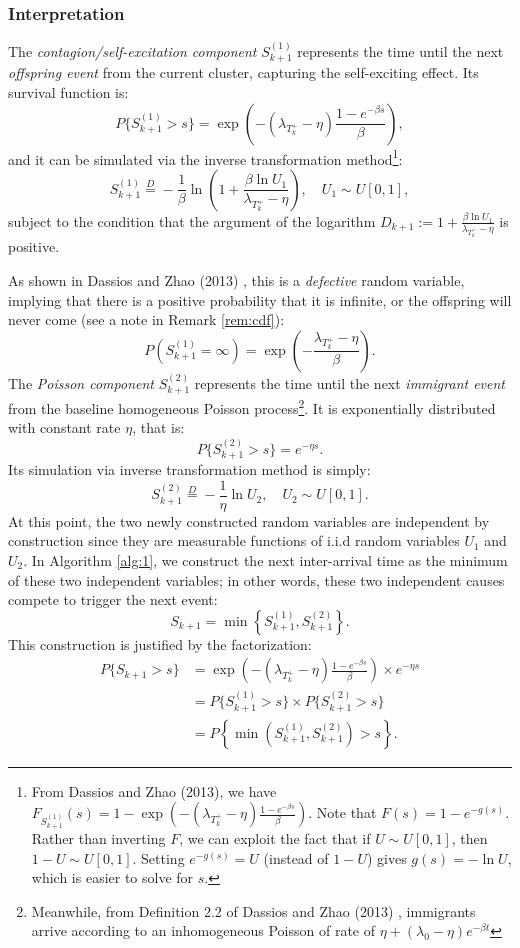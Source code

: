 \documentclass[12pt,a4paper]{report}
\theoremstyle{plain}
\theoremstyle{definition}
\theoremstyle{remark}
\newcommand{\1}{\mathbf{1}}
\begin{document}
\subsubsection*{Interpretation}
The \emph{contagion/self-excitation component} \(S_{k+1}^{(1)}\) represents the time until the next \emph{offspring event} from the current cluster, capturing the self-exciting effect. Its survival function is:
\[
P\{S_{k+1}^{(1)} > s\} = \exp\left(-\left(\lambda_{T_k^+} - \eta\right)\frac{1 - e^{-\beta s}}{\beta}\right),
\]
and it can be simulated via the inverse transformation method\footnote{From Dassios and Zhao (2013), we have $F_{S_{k+1}^{(1)}}(s) = 1 - \exp\left(-\left(\lambda_{T_k^+} - \eta\right)\frac{1 - e^{-\beta s}}{\beta}\right)
$. Note that $F(s)=1-e^{-g(s)}$. Rather than inverting $F$, we can exploit the fact that if $U\sim U[0,1]$, then $1-U\sim U[0,1]$. Setting $e^{-g(s)} = U$ (instead of $1-U$) gives $g(s) = -\ln U$, which is easier to solve for $s$.}:
\[
S_{k+1}^{(1)} \stackrel{D}{=} -\frac{1}{\beta} \ln\left(1 + \frac{\beta \ln U_1}{\lambda_{T_k^+} - \eta}\right), \quad U_1 \sim U[0,1],
\]
subject to the condition that the argument of the logarithm $D_{k+1} := 1 + \frac{\beta \ln U_1}{\lambda_{T_k^+} - \eta}$ is positive.

\noindent
As shown in Dassios and Zhao (2013) \cite{DZ13}, this is a \emph{defective} random variable, implying that there is a positive probability that it is infinite, or the offspring will never come (see a note in Remark \ref{rem:cdf}):
\[
P(S_{k+1}^{(1)} = \infty) = \exp\left( -\frac{\lambda_{T_k^+} - \eta}{\beta} \right).
\]
\medskip
\noindent
The \emph{Poisson component} \(S_{k+1}^{(2)}\) represents the time until the next \emph{immigrant event} from the baseline homogeneous Poisson process\footnote{Meanwhile, from Definition 2.2 of Dassios and Zhao (2013) \cite{DZ13}, immigrants arrive according to an inhomogeneous Poisson of rate of $\eta+ (\lambda_0 -\eta)e^{-\beta t}$}. It is exponentially distributed with constant rate \(\eta\), that is:
\[
P\{S_{k+1}^{(2)} > s\} = e^{-\eta s}.
\]
Its simulation via inverse transformation method is simply:
\[
S_{k+1}^{(2)} \stackrel{D}{=} -\frac{1}{\eta} \ln U_2, \quad U_2 \sim U[0,1].
\]
\noindent
At this point, the two newly constructed random variables are independent by construction since they are measurable functions of i.i.d random variables $U_1$ and $U_2$. In Algorithm \ref{alg:1}, we construct the next inter-arrival time as the minimum of these two independent variables; in other words, these two independent causes compete to trigger the next event:
\[
S_{k+1} = \min\left\{S_{k+1}^{(1)}, S_{k+1}^{(2)}\right\}.
\]
\noindent
This construction is justified by the factorization:
\[
\begin{aligned}
P\{S_{k+1} > s\} &= \exp\left(-\left(\lambda_{T_k^+} - \eta\right)\frac{1 - e^{-\beta s}}{\beta}\right) \times e^{-\eta s} \\
&= P\{S_{k+1}^{(1)} > s\} \times P\{S_{k+1}^{(2)} > s\} \\
&= P\left\{\min\left(S_{k+1}^{(1)}, S_{k+1}^{(2)}\right) > s\right\}.
\end{aligned}
\]
\end{document}
